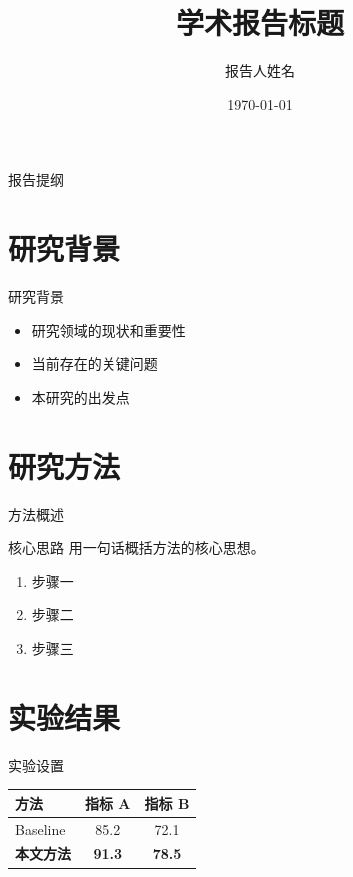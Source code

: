 \documentclass[
    aspectratio=169,
    fontset=windows,
]{ctexbeamer}
\title{学术报告标题}
\author{报告人姓名}
\date{\today}
\begin{document}
\maketitle

\begin{frame}{报告提纲}
  \tableofcontents[hideallsubsections]
\end{frame}

\section{研究背景}

\begin{frame}{研究背景}
  \begin{itemize}
    \item 研究领域的现状和重要性
    \item 当前存在的关键问题
    \item 本研究的出发点
  \end{itemize}
\end{frame}

\section{研究方法}

\begin{frame}{方法概述}
  \begin{block}{核心思路}
    用一句话概括方法的核心思想。
  \end{block}

  \begin{enumerate}
    \item 步骤一
    \item 步骤二
    \item 步骤三
  \end{enumerate}
\end{frame}

\section{实验结果}

\begin{frame}{实验设置}
  \begin{table}
    \centering
    \begin{tabular}{lcc}
      \toprule
      \textbf{方法} & \textbf{指标 A} & \textbf{指标 B} \\
      \midrule
      Baseline & 85.2 & 72.1 \\
      \textbf{本文方法} & \textbf{91.3} & \textbf{78.5} \\
      \bottomrule
    \end{tabular}
  \end{table}
\end{frame}
\end{document}

